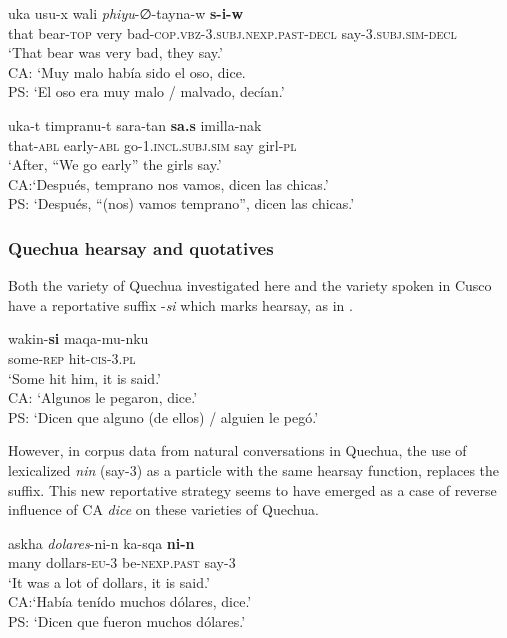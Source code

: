 \documentclass[output=paper,hidelinks]{langscibook}
\begin{document}
\ea \label{ex:siw}
\gll uka usu-x wali \textit{phiyu}-∅-tayna-w \textbf{s-i-w} \\
that bear-\textsc{top} very bad-\textsc{cop.vbz-3.subj.nexp.past-decl} say-\textsc{3.subj.sim-decl} \\ 
\glt ‘That bear was very bad, they say.’\\
CA: `Muy malo había sido el oso, dice.\\
PS: `El oso era muy malo / malvado, decían.'
\z

\ea \label{ex:sas}
\gll uka-t timpranu-t sara-tan \textbf{sa.s} imilla-nak \\
that-\textsc{abl} early-\textsc{abl} go-\textsc{1.incl.subj.sim} say girl-\textsc{pl} \\ 
\glt `After, “We go early” the girls say.’\\
CA:`Después, temprano nos vamos, dicen las chicas.'\\
PS: `Después, “(nos) vamos temprano”, dicen las chicas.'

\z

\subsubsection{Quechua hearsay and quotatives}

Both the variety of Quechua investigated here and the variety spoken in Cusco have a reportative suffix -\textit{si} which marks hearsay, as in .

\ea \label{ex:cusco}
\gll wakin-\textbf{si} maqa-mu-nku \\
some-\textsc{rep} hit-\textsc{cis-3.pl} \\ \glt `Some hit him, it is said.’ \citep[22]{faller2002semantics}\\
CA: `Algunos le pegaron, dice.'\\
PS: `Dicen que alguno (de ellos) / alguien le pegó.'
\z

However, in corpus data from natural conversations in Quechua, the use of lexicalized \textit{nin} (say-\textsc{3}) as a particle with the same hearsay function, replaces the suffix. This new reportative strategy seems to have emerged as a case of reverse influence of CA \textit{dice} \citep{olbertz2005dizque, dankel2012convergencias} on these varieties of Quechua.

\ea \label{ex:Q-nin}
\gll askha \textit{dolares}-ni-n ka-sqa \textbf{ni-n} \\
many dollars-\textsc{eu-3} be-\textsc{nexp.past} say-\textsc{3} \\ \glt `It was a lot of dollars, it is said.' \citep[96]{dankel2012convergencias}\\
CA:`Había tenído muchos dólares, dice.'\\
PS: `Dicen que fueron muchos dólares.'
\end{document}
